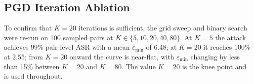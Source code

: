 \subsection{PGD Iteration Ablation}
\label{ssec:ev_spectral_k}

To confirm that $K = 20$ iterations is sufficient, the grid sweep and binary search were re-run on 100 sampled pairs at $K \in \{5, 10, 20, 40, 80\}$. At $K = 5$ the attack achieves 99\% pair-level ASR with a mean $\varepsilon_\text{min}$ of 6.48; at $K = 20$ it reaches 100\% at 2.55; from $K = 20$ onward the curve is near-flat, with $\varepsilon_\text{min}$ changing by less than 15\% between $K = 20$ and $K = 80$. The value $K = 20$ is the knee point and is used throughout.

